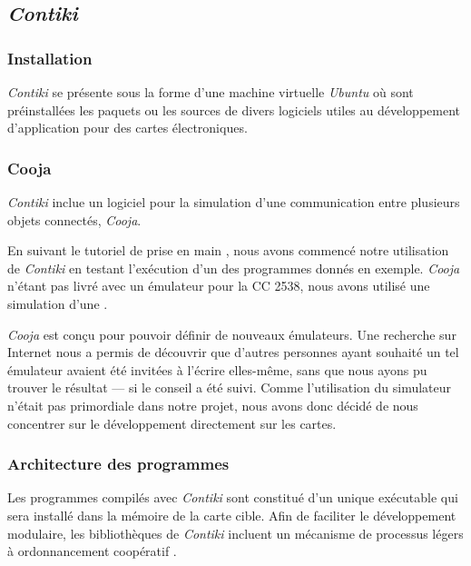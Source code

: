 \subsection{\emph{Contiki}}

\subsubsection{Installation}

\emph{Contiki} se présente sous la forme d’une machine virtuelle \emph{Ubuntu} où sont préinstallées les paquets ou les sources de divers logiciels utiles au développement d’application pour des cartes électroniques.


\subsubsection{Cooja}

\emph{Contiki} inclue un logiciel pour la simulation d’une communication entre plusieurs objets connectés, \emph{Cooja}.

En suivant le tutoriel de prise en main , nous avons commencé notre utilisation de \emph{Contiki} en testant l’exécution d’un des programmes donnés en exemple.
\emph{Cooja} n’étant pas livré avec un émulateur pour la CC 2538, nous avons utilisé une simulation d’une \todo[skymote ?].


\emph{Cooja} est conçu pour pouvoir définir de nouveaux émulateurs.
Une recherche sur Internet nous a permis de découvrir que d’autres personnes ayant souhaité un tel émulateur avaient été invitées à l’écrire elles-même, sans que nous ayons pu trouver le résultat — si le conseil a été suivi.
Comme l’utilisation du simulateur n’était pas primordiale dans notre projet, nous avons donc décidé de nous concentrer sur le développement directement sur les cartes.

\subsubsection{Architecture des programmes}

Les programmes compilés avec \emph{Contiki} sont constitué d’un unique exécutable qui sera installé dans la mémoire de la carte cible.
Afin de faciliter le développement modulaire, les bibliothèques de \emph{Contiki} incluent un mécanisme de processus légers à ordonnancement coopératif .

